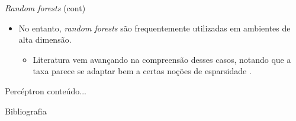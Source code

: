 \documentclass[11pt]{beamer}
\begin{document}
\begin{frame}{\textit{Random forests} (cont)}
\begin{itemize}
 	\item No entanto, \textit{random forests} são frequentemente utilizadas em ambientes de alta dimensão.
	\begin{itemize}
		\item Literatura vem avançando na compreensão desses casos, notando que a taxa parece se adaptar bem a certas noções de esparsidade \citep{syrgkanis2020estimation}.
	\end{itemize}
\end{itemize}
\end{frame}

\begin{frame}{Percéptron}
	conteúdo...
\end{frame}


	\appendix
		\begin{frame}[allowframebreaks]{Bibliografia}
	\printbibliography

	\end{frame}
\end{document}
